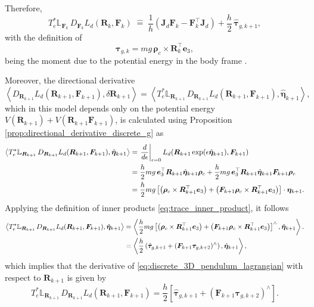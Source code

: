 Therefore,
\begin{equation}\label{eq:discrete_3D_pendulum_derivative_fk}
    T_e^*\mathbb{L}_{\bm{F}_k}\,D_{\bm{F}_k}L_d(\bm{R}_k,\bm{F}_k)
    \;\widehat{=}\;
    \frac{1}{h}\left(\bm{J}_d \bm{F}_k - \bm{F}_k^{\top}\bm{J}_d\right)
    +
    \frac{h}{2}\,\hat{\bm{\tau}}_{g,k+1},
\end{equation}
    with the definition of
\begin{equation}\label{eq:3d_pendulum_gravity_moment}
    \bm{\tau}_{g,k} = mg\,\bm{\rho}_c\times \bm{R}_{k}^{\top}\bm{e}_3,
\end{equation}
being the moment due to the potential energy in the body frame \cite{Lee2008}.

Moreover, the directional derivative 
\[
\left\langle
D_{\bm{R}_{k+1}}L_d(\bm{R}_{k+1},\bm{F}_{k+1}),
\delta \bm{R}_{k+1}
\right\rangle = \left\langle
T_e^*\mathbb{L}_{\bm{R}_{k+1}}\,D_{\bm{R}_{k+1}}L_d(\bm{R}_{k+1},\bm{F}_{k+1}),
\hat{\bm{\eta}}_{k+1}
\right\rangle,
\] which in this model depends only on the potential energy $V(\bm{R}_{k+1})+V(\bm{R}_{k+1} \bm{F}_{k+1})$, is calculated using Proposition \eqref{prop:directional_derivative_discrete_g} as
{\small
\begin{align}
\left\langle
T_e^*\mathbb{L}_{\bm{R}_{k+1}}\,D_{\bm{R}_{k+1}}L_d(\bm{R}_{k+1},\bm{F}_{k+1}),
\hat{\bm{\eta}}_{k+1}
\right\rangle
\notag
&=
\left.\frac{d}{d\epsilon}\right|_{\epsilon=0}
L_d\!\left(
\bm{R}_{k+1}\exp(\epsilon\hat{\bm{\eta}}_{k+1}),
\bm{F}_{k+1}
\right)
\notag\\
&=
\frac{h}{2}mg\,\bm{e}_3^{\top}\bm{R}_{k+1}\hat{\bm{\eta}}_{k+1}\bm{\rho}_c
+
\frac{h}{2}mg\,\bm{e}_3^{\top}\bm{R}_{k+1}\hat{\bm{\eta}}_{k+1}\bm{F}_{k+1}\bm{\rho}_c
\notag\\
&=
\frac{h}{2}mg
\left[
\left(\bm{\rho}_c\times \bm{R}_{k+1}^{\top}\bm{e}_3\right)
+
\left(\bm{F}_{k+1}\bm{\rho}_c\times \bm{R}_{k+1}^{\top}\bm{e}_3\right)
\right]\cdot \bm{\eta}_{k+1}.
\notag
\end{align}}
Applying the definition of inner products \eqref{eq:trace_inner_product}, it follows 
{\small
\begin{align}  
 \left\langle
T_e^*\mathbb{L}_{\bm{R}_{k+1}}\,D_{\bm{R}_{k+1}}L_d(\bm{R}_{k+1},\bm{F}_{k+1}),
\hat{\bm{\eta}}_{k+1}
\right\rangle
&=
\left\langle
\frac{h}{2}mg
\left[
\left(\bm{\rho}_c\times \bm{R}_{k+1}^{\top}\bm{e}_3\right)
+
\left(\bm{F}_{k+1}\bm{\rho}_c\times \bm{R}_{k+1}^{\top}\bm{e}_3\right)
\right]^\wedge,
\hat{\bm{\eta}}_{k+1}
\right\rangle.
\notag \\
&=
\left\langle
\frac{h}{2}
\left(
\hat{\bm{\tau}}_{g,k+1}
+
(\bm{F}_{k+1}\bm{\tau}_{g,k+2})^\wedge
\right),
\hat{\bm{\eta}}_{k+1}
\right\rangle,
\notag
\end{align}
}
which implies that the derivative of \eqref{eq:discrete_3D_pendulum_lagrangian} with respect to $\bm{R}_{k+1}$ is given by
\begin{equation}\label{eq:discrete_3D_pendulum_derivative_gk}
    T_e^*\mathbb{L}_{\bm{R}_{k+1}}\,D_{\bm{R}_{k+1}}L_d(\bm{R}_{k+1},\bm{F}_{k+1}) = \frac{h}{2}
\left[
\hat{\bm{\tau}}_{g,k+1}
+
(\bm{F}_{k+1}\bm{\tau}_{g,k+2})^\wedge
\right].
\end{equation}

